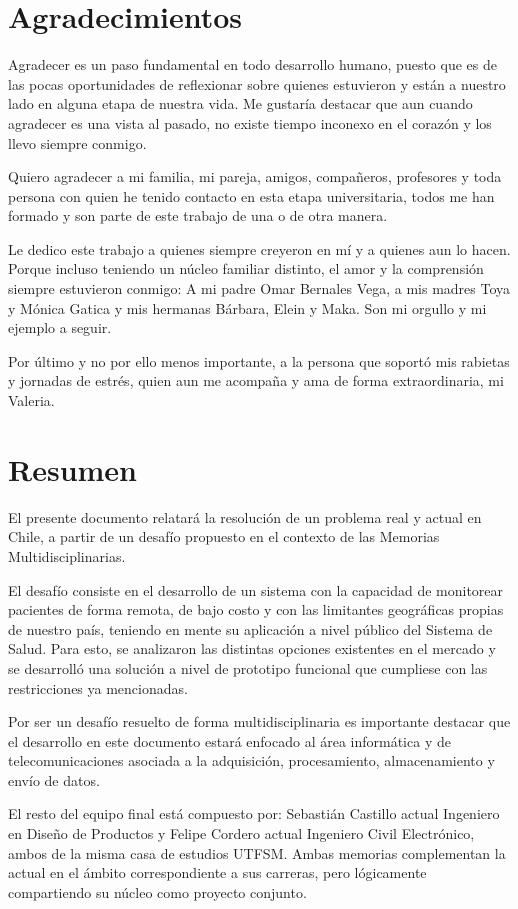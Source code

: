\section*{Agradecimientos}

Agradecer es un paso fundamental en todo desarrollo humano, puesto que es de las pocas oportunidades de reflexionar sobre quienes estuvieron y están a nuestro lado en alguna etapa de nuestra vida. Me gustaría destacar que aun cuando agradecer es una vista al pasado, no existe tiempo inconexo en el corazón y los llevo siempre conmigo.

Quiero agradecer a mi familia, mi pareja, amigos, compañeros, profesores y toda persona con quien he tenido contacto en esta etapa universitaria, todos me han formado y son parte de este trabajo de una o de otra manera.

Le dedico este trabajo a quienes siempre creyeron en mí y a quienes aun lo hacen. Porque incluso teniendo un núcleo familiar distinto, el amor y la comprensión siempre estuvieron conmigo: A mi padre Omar Bernales Vega, a mis madres Toya y Mónica Gatica y mis hermanas Bárbara, Elein y Maka. Son mi orgullo y mi ejemplo a seguir.

Por último y no por ello menos importante, a la persona que soportó mis rabietas y jornadas de estrés, quien aun me acompaña y ama de forma extraordinaria, mi Valeria.

\newpage

\section*{Resumen}

El presente documento relatará la resolución de un problema real y actual en Chile, a partir de un desafío propuesto en el contexto de las Memorias Multidisciplinarias.\par
El desafío consiste en el desarrollo de un sistema con la capacidad de monitorear pacientes de forma remota, de bajo costo y con las limitantes geográficas propias de nuestro país, teniendo en mente su aplicación a nivel público del Sistema de Salud. Para esto, se analizaron las distintas opciones existentes en el mercado y se desarrolló una solución a nivel de prototipo funcional que cumpliese con las restricciones ya mencionadas.\par
Por ser un desafío resuelto de forma multidisciplinaria es importante destacar que el desarrollo en este documento estará enfocado al área informática y de telecomunicaciones asociada a la adquisición, procesamiento, almacenamiento y envío de datos.\par
El resto del equipo final está compuesto por: Sebastián Castillo actual Ingeniero en Diseño de Productos y Felipe Cordero actual Ingeniero Civil Electrónico, ambos de la misma casa de estudios UTFSM. Ambas memorias complementan la actual en el ámbito correspondiente a sus carreras, pero lógicamente compartiendo su núcleo como proyecto conjunto.
\newpage

